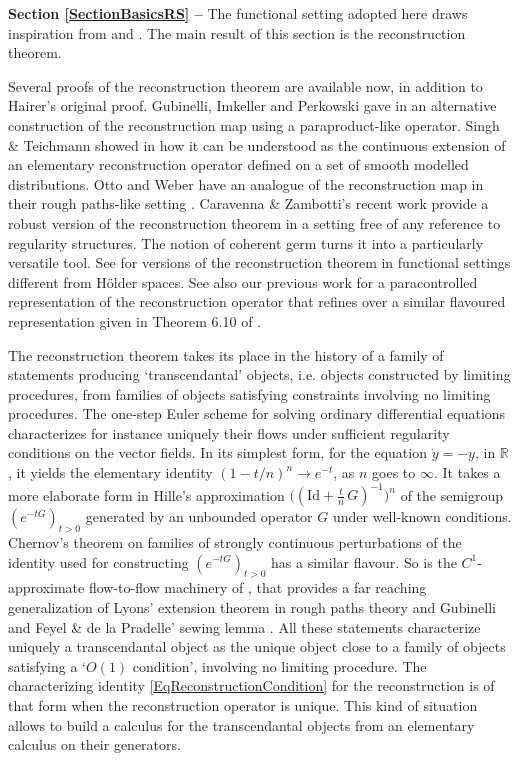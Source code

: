 \documentclass[10pt, reqno]{amsart}
\numberwithin{subsection}{section}
\numberwithin{subsubsection}{subsection}
\numberwithin{equation}{section} %
\theoremstyle{mystyle}
\theoremstyle{mystyle2}
\theoremstyle{mystyle3}
\newcommand{\ssk}{\smallskip}
\newcommand\bbR{\mathbb{R}}
\begin{document}
\textbf{\textsf{Section \ref{SectionBasicsRS} -- }} The functional setting adopted here draws inspiration from \cite{BB1,BB2, BB3} and \cite{OttoWeber}. The main result of this section is the reconstruction theorem.

\ssk

Several proofs of the reconstruction theorem are available now, in addition to Hairer's original proof. Gubinelli, Imkeller and Perkowski gave in \cite{GIP} an alternative construction of the reconstruction map using a paraproduct-like operator. Singh \& Teichmann showed in \cite{SinghTeichmann} how it can be understood as the continuous extension of an elementary reconstruction operator defined on a set of smooth modelled distributions. Otto and Weber have an analogue of the reconstruction map in their rough paths-like setting \cite{OttoWeber, OSSW}. Caravenna \& Zambotti's recent work \cite{CaravennaZambotti} provide a robust version of the reconstruction theorem in a setting free of any reference to regularity structures. The notion of coherent germ turns it into a particularly versatile tool. See \cite{HairerLabbe, HenselRosati, LiuPromelTeichmann} for versions of the reconstruction theorem in functional settings different from H\"older spaces. See also our previous work \cite{BH1} for a paracontrolled representation of the reconstruction operator that refines over a similar flavoured representation given in Theorem 6.10 of \cite{GIP}.

\ssk

The reconstruction theorem takes its place in the history of a family of statements producing `transcendantal' objects, i.e. objects constructed by limiting procedures, from families of objects satisfying constraints involving no limiting procedures. The one-step Euler scheme for solving ordinary differential equations characterizes for instance uniquely their flows under sufficient regularity conditions on the vector fields. In its simplest form, for the equation $\dot y=-y$, in $\bbR$, it yields the elementary identity $(1-t/n)^n\rightarrow e^{-t}$, as $n$ goes to $\infty$. 
It takes a more elaborate form in Hille's approximation $\big((\textrm{Id}+\frac{t}{n}\,G)^{-1}\big)^n$ of the semigroup $(e^{-tG})_{t>0}$ generated by an unbounded operator $G$ under well-known conditions. Chernov's theorem \cite{Chernov} on families of strongly continuous perturbations of the identity used for constructing $(e^{-tG})_{t>0}$ has a similar flavour. So is the $C^1$-approximate flow-to-flow machinery of \cite{BailleulRMI}, that provides a far reaching generalization of Lyons' extension theorem in rough paths theory and Gubinelli and Feyel \& de la Pradelle' sewing lemma \cite{GubinelliControlled, FdlP, FdlPM}. All these statements characterize uniquely a transcendantal object as the unique object close to a family of objects satisfying a `$O(1)$ condition', involving no limiting procedure. The characterizing identity \eqref{EqReconstructionCondition} for the reconstruction is of that form when the reconstruction operator 
is unique. This kind of situation allows to build a calculus for the transcendantal objects from an elementary calculus on their generators.   
\end{document}

